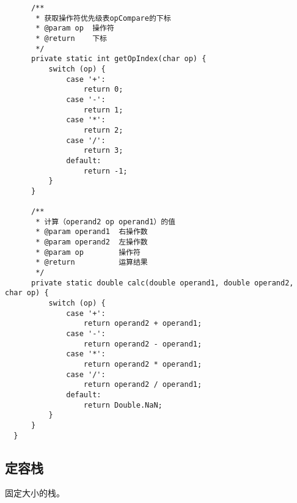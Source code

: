 \documentclass{article}
\begin{document}
\begin{verbatim}
      /**
       * 获取操作符优先级表opCompare的下标
       * @param op  操作符
       * @return    下标
       */
      private static int getOpIndex(char op) {
          switch (op) {
              case '+':
                  return 0;
              case '-':
                  return 1;
              case '*':
                  return 2;
              case '/':
                  return 3;
              default:
                  return -1;
          }
      }

      /**
       * 计算（operand2 op operand1）的值
       * @param operand1  右操作数
       * @param operand2  左操作数
       * @param op        操作符
       * @return          运算结果
       */
      private static double calc(double operand1, double operand2, char op) {
          switch (op) {
              case '+':
                  return operand2 + operand1;
              case '-':
                  return operand2 - operand1;
              case '*':
                  return operand2 * operand1;
              case '/':
                  return operand2 / operand1;
              default:
                  return Double.NaN;
          }
      }
  }
  \end{verbatim}

  \subsection{定容栈}
  固定大小的栈。
\end{document}
